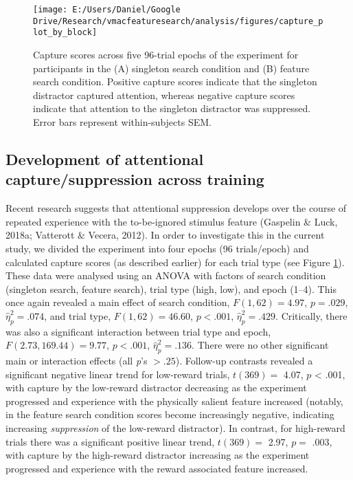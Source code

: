 \documentclass[man, a4paper, noextraspace, 11pt,floatsintext]{apa6}
\begin{document}
\begin{figure}[!h]

{\centering \texttt{[image: E:/Users/Daniel/Google Drive/Research/vmacfeaturesearch/analysis/figures/capture\_plot\_by\_block]} 

}

\caption{Capture scores across five 96-trial epochs of the
experiment for participants in the (A) singleton search condition and
(B) feature search condition. Positive capture scores indicate that the
singleton distractor captured attention, whereas negative capture scores
indicate that attention to the singleton distractor was suppressed.
Error bars represent within-subjects SEM.}\label{fig:blockPlot}
\end{figure}

\subsection{Development of attentional capture/suppression across
training}\label{development-of-attentional-capturesuppression-across-training}

Recent research suggests that attentional suppression develops over the
course of repeated experience with the to-be-ignored stimulus feature
(Gaspelin \& Luck, 2018a; Vatterott \& Vecera, 2012). In order to
investigate this in the current study, we divided the experiment into
four epochs (96 trials/epoch) and calculated capture scores (as
described earlier) for each trial type (see Figure \ref{fig:blockPlot}).
These data were analysed using an ANOVA with factors of search condition
(singleton search, feature search), trial type (high, low), and epoch
(1--4). This once again revealed a main effect of search condition,
\(F(1, 62) = 4.97\), \(p = .029\), \(\hat{\eta}^2_p = .074\), and trial
type, \(F(1, 62) = 46.60\), \(p < .001\), \(\hat{\eta}^2_p = .429\).
Critically, there was also a significant interaction between trial type
and epoch, \(F(2.73, 169.44) = 9.77\), \(p < .001\),
\(\hat{\eta}^2_p = .136\). There were no other significant main or
interaction effects (all \emph{p}'s \(>.25\)). Follow-up contrasts
revealed a significant negative linear trend for low-reward trials,
\(t(369)=\) 4.07, \(p\) \textless{} .001, with capture by the low-reward
distractor decreasing as the experiment progressed and experience with
the physically salient feature increased (notably, in the feature search
condition scores become increasingly negative, indicating increasing
\emph{suppression} of the low-reward distractor). In contrast, for
high-reward trials there was a significant positive linear trend,
\(t(369)=\) 2.97, \(p=\) .003, with capture by the high-reward
distractor increasing as the experiment progressed and experience with
the reward associated feature increased.
\end{document}
